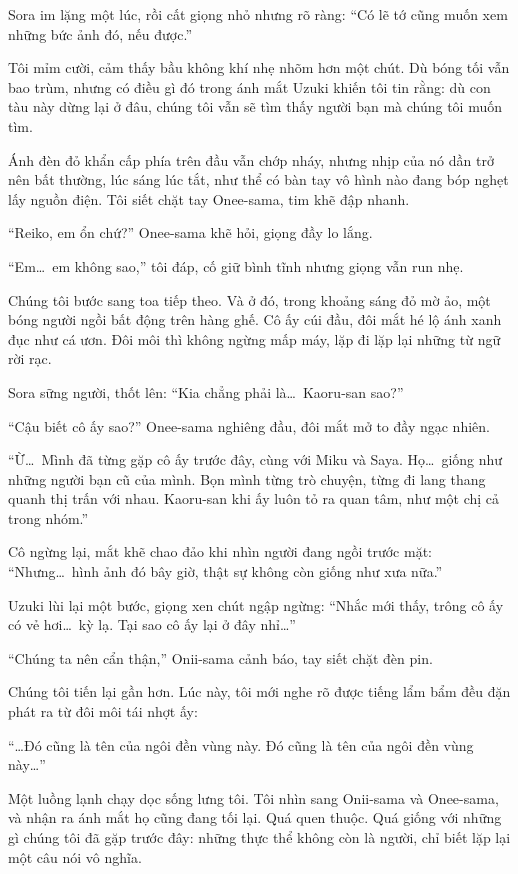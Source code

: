 \documentclass[../main.tex]{subfiles}
\begin{document}
Sora im lặng một lúc, rồi cất giọng nhỏ nhưng rõ ràng: ``Có lẽ tớ cũng muốn xem những bức ảnh đó, nếu được.''

Tôi mỉm cười, cảm thấy bầu không khí nhẹ nhõm hơn một chút. Dù bóng tối vẫn bao trùm, nhưng có điều gì đó trong ánh mắt Uzuki khiến tôi tin rằng: dù con tàu này dừng lại ở đâu, chúng tôi vẫn sẽ tìm thấy người bạn mà chúng tôi muốn tìm.

\ct

Ánh đèn đỏ khẩn cấp phía trên đầu vẫn chớp nháy, nhưng nhịp của nó dần trở nên bất thường, lúc sáng lúc tắt, như thể có bàn tay vô hình nào đang bóp nghẹt lấy nguồn điện. Tôi siết chặt tay Onee-sama, tim khẽ đập nhanh.

``Reiko, em ổn chứ?'' Onee-sama khẽ hỏi, giọng đầy lo lắng.

``Em\dots\ em không sao,'' tôi đáp, cố giữ bình tĩnh nhưng giọng vẫn run nhẹ.

Chúng tôi bước sang toa tiếp theo. Và ở đó, trong khoảng sáng đỏ mờ ảo, một bóng người ngồi bất động trên hàng ghế. Cô ấy cúi đầu, đôi mắt hé lộ ánh xanh đục như cá ươn. Đôi môi thì không ngừng mấp máy, lặp đi lặp lại những từ ngữ rời rạc.


Sora sững người, thốt lên: ``Kia chẳng phải là\dots\ Kaoru-san sao?''

``Cậu biết cô ấy sao?'' Onee-sama nghiêng đầu, đôi mắt mở to đầy ngạc nhiên.

``Ừ\dots\ Mình đã từng gặp cô ấy trước đây, cùng với Miku và Saya. Họ\dots\ giống như những người bạn cũ của mình. Bọn mình từng trò chuyện, từng đi lang thang quanh thị trấn với nhau. Kaoru-san khi ấy luôn tỏ ra quan tâm, như một chị cả trong nhóm.''

Cô ngừng lại, mắt khẽ chao đảo khi nhìn người đang ngồi trước mặt: ``Nhưng\dots\ hình ảnh đó bây giờ, thật sự không còn giống như xưa nữa.''

Uzuki lùi lại một bước, giọng xen chút ngập ngừng: ``Nhắc mới thấy, trông cô ấy có vẻ hơi\dots\ kỳ lạ. Tại sao cô ấy lại ở đây nhỉ\dots''

``Chúng ta nên cẩn thận,'' Onii-sama cảnh báo, tay siết chặt đèn pin.

Chúng tôi tiến lại gần hơn. Lúc này, tôi mới nghe rõ được tiếng lẩm bẩm đều đặn phát ra từ đôi môi tái nhợt ấy:

``\dots Đó cũng là tên của ngôi đền vùng này. Đó cũng là tên của ngôi đền vùng này\dots''

Một luồng lạnh chạy dọc sống lưng tôi. Tôi nhìn sang Onii-sama và Onee-sama, và nhận ra ánh mắt họ cũng đang tối lại. Quá quen thuộc. Quá giống với những gì chúng tôi đã gặp trước đây: những thực thể không còn là người, chỉ biết lặp lại một câu nói vô nghĩa.
\end{document}
